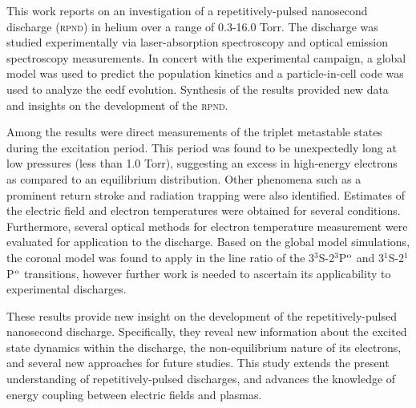This work reports on an investigation of a repetitively-pulsed nanosecond
discharge (\textsc{rpnd}) in helium over a range of 0.3-16.0 Torr. The discharge
was studied experimentally via laser-absorption spectroscopy and optical
emission spectroscopy measurements. In concert with the experimental campaign, a
global model was used to predict the population kinetics and a particle-in-cell
code was used to analyze the \acs{eedf} evolution. Synthesis of the results
provided new data and insights on the development of the \textsc{rpnd}.

Among the results were direct measurements of the triplet metastable states
during the excitation period. This period was found to be unexpectedly long at
low pressures (less than 1.0 Torr), suggesting an excess in high-energy
electrons as compared to an equilibrium distribution. Other phenomena such as a
prominent return stroke and radiation trapping were also identified. Estimates
of the electric field and electron temperatures were obtained for several
conditions. Furthermore, several optical methods for electron temperature
measurement were evaluated for application to the discharge. Based on the global
model simulations, the coronal model was found to apply in the line ratio of the
3$^3$S-2$^3$P$^\mathrm{o}$ and 3$^1$S-2$^1$P$^\mathrm{o}$ transitions, however further work is
needed to ascertain its applicability to experimental discharges.

These results provide new insight on the development of the repetitively-pulsed
nanosecond discharge. Specifically, they reveal new information about the
excited state dynamics within the discharge, the non-equilibrium nature of its
electrons, and several new approaches for future studies. This study extends the
present understanding of repetitively-pulsed discharges, and advances the
knowledge of energy coupling between electric fields and plasmas.
